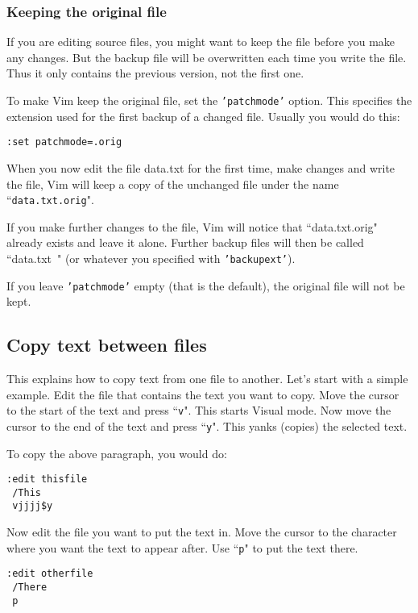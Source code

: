 \subsubsection{Keeping the original file}
If you are editing source files, you might want to keep the file before you make any changes.
But the backup file will be overwritten each time you write the file.
Thus it only contains the previous version, not the first one.

To make Vim keep the original file, set the \texttt{'patchmode'} option.
This specifies the extension used for the first backup of a changed file.
Usually you would do this:

 \begin{Verbatim}[samepage=true]
 :set patchmode=.orig
 \end{Verbatim}

When you now edit the file data.txt for the first time, make changes and write the file, Vim will keep a copy of the unchanged file under the name ``\texttt{data.txt.orig}".

If you make further changes to the file, Vim will notice that ``data.txt.orig" already exists and leave it alone.
Further backup files will then be called ``data.txt~" (or whatever you specified with \texttt{'backupext'}).

If you leave \texttt{'patchmode'} empty (that is the default), the original file will not be kept.

\subsection{Copy text between files}
This explains how to copy text from one file to another.
Let's start with a simple example.
Edit the file that contains the text you want to copy.
Move the cursor to the start of the text and press ``\texttt{v}".
This starts Visual mode.
Now move the cursor to the end of the text and press ``\texttt{y}".
This yanks (copies) the selected text.

To copy the above paragraph, you would do:

 \begin{Verbatim}[samepage=true]
 :edit thisfile
 /This
 vjjjj$y
 \end{Verbatim}

Now edit the file you want to put the text in.
Move the cursor to the character where you want the text to appear after.
Use ``\texttt{p}" to put the text there.

 \begin{Verbatim}[samepage=true]
 :edit otherfile
 /There
 p
 \end{Verbatim}


